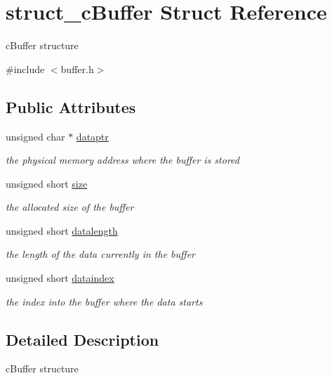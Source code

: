 \hypertarget{structstruct__c_buffer}{\section{struct\-\_\-c\-Buffer \-Struct \-Reference}
\label{structstruct__c_buffer}
}


c\-Buffer structure  




{\ttfamily \#include $<$buffer.\-h$>$}

\subsection*{\-Public \-Attributes}
\begin{DoxyCompactItemize}
\item 
unsigned char $\ast$ \hyperlink{structstruct__c_buffer_ac5d0be464bcb156e014d1f6e5ad63330}{dataptr}
\begin{DoxyCompactList}\small\item\em the physical memory address where the buffer is stored \end{DoxyCompactList}\item 
unsigned short \hyperlink{structstruct__c_buffer_a80e300447a52eb0b66fd4d754aeb9b1c}{size}
\begin{DoxyCompactList}\small\item\em the allocated size of the buffer \end{DoxyCompactList}\item 
unsigned short \hyperlink{structstruct__c_buffer_ace222cd69a1c185a47f0922c4c626bbd}{datalength}
\begin{DoxyCompactList}\small\item\em the length of the data currently in the buffer \end{DoxyCompactList}\item 
unsigned short \hyperlink{structstruct__c_buffer_a7e8a4fbfa270d36207de44b2ed5e7c8c}{dataindex}
\begin{DoxyCompactList}\small\item\em the index into the buffer where the data starts \end{DoxyCompactList}\end{DoxyCompactItemize}


\subsection{\-Detailed \-Description}
c\-Buffer structure 

